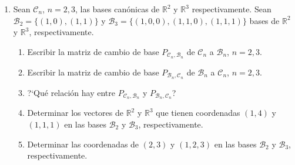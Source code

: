 \documentclass[12pt]{amsart}
\begin{document}
\begin{enumerate}
\item\label{otras bases} Sean $\mathcal{C}_n$, $n=2,3$, las bases can\'onicas de $\mathbb{R}^2$ y $\mathbb{R}^3$ respectivamente. Sean
	$\mathcal{B}_2=\{(1,0),(1,1)\}$ y $\mathcal{B}_3=\{(1,0,0),(1,1,0),(1,1,1)\}$ bases de $\mathbb{R}^2$ y $\mathbb{R}^3$, respectivamente.
	\begin{enumerate}
		\item Escribir la matriz de cambio de base $P_{{\mathcal{C}_n},{\mathcal{B}_n}}$ de $\mathcal{C}_n$ a $\mathcal{B}_n$, $n=2,3$.
		\item Escribir la matriz de cambio de base $P_{{\mathcal{B}_n},{\mathcal{C}_n}}$ de $\mathcal{B}_n$ a $\mathcal{C}_n$, $n=2,3$.
		\item ?`Qu\'e relaci\'on hay entre $P_{{\mathcal{C}_n},{\mathcal{B}_n}}$ y $P_{{\mathcal{B}_n},{\mathcal{C}_n}}$?
		\item Determinar los vectores de $\mathbb{R}^2$ y $\mathbb{R}^3$ que tienen coordenadas $(1,4)$ y $(1,1,1)$ en las bases $\mathcal{B}_2$ y $\mathcal{B}_3$, respectivamente.
		\item Determinar las coordenadas de $(2,3)$ y $(1,2,3)$ en las bases $\mathcal{B}_2$ y $\mathcal{B}_3$, respectivamente.
	\end{enumerate}
	

\end{enumerate}
\end{document}
